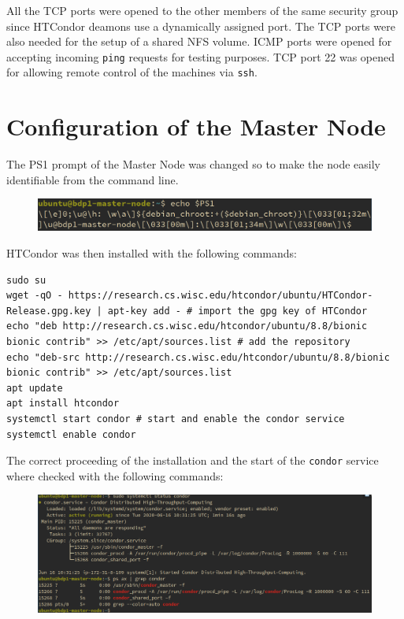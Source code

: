 \documentclass{article}
\begin{document}
All the TCP ports were opened to the other members of the same security group since HTCondor deamons use a dynamically assigned port.
The TCP ports were also needed for the setup of a shared NFS volume.
ICMP ports were opened for accepting incoming \texttt{ping} requests for testing purposes.
TCP port 22 was opened for allowing remote control of the machines via \texttt{ssh}.

\section{Configuration of the Master Node}
The PS1 prompt of the Master Node was changed so to make the node easily identifiable from the command line.

\begin{figure}[!h]
	\center
	\includegraphics[width=\textwidth]{./images/master-ps1.png}
\end{figure}
\pagebreak

HTCondor was then installed with the following commands:

\begin{lstlisting}
sudo su
wget -qO - https://research.cs.wisc.edu/htcondor/ubuntu/HTCondor-Release.gpg.key | apt-key add - # import the gpg key of HTCondor
echo "deb http://research.cs.wisc.edu/htcondor/ubuntu/8.8/bionic bionic contrib" >> /etc/apt/sources.list # add the repository
echo "deb-src http://research.cs.wisc.edu/htcondor/ubuntu/8.8/bionic bionic contrib" >> /etc/apt/sources.list
apt update
apt install htcondor
systemctl start condor # start and enable the condor service
systemctl enable condor
\end{lstlisting}

The correct proceeding of the installation and the start of the \texttt{condor} service where checked with the following commands:

\begin{figure}[!h]
	\center
	\includegraphics[width=\textwidth]{./images/condor_installed.png}
\end{figure}
\end{document}
